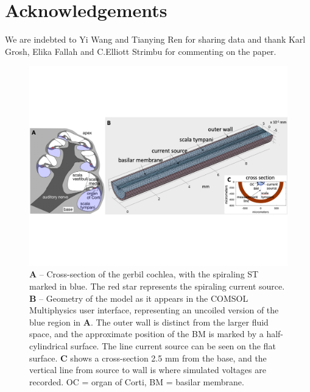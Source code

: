 \documentclass{biophys-new}
\begin{document}
\section{Acknowledgements}
\par{We are indebted to Yi Wang and Tianying Ren for sharing data and thank Karl Grosh, Elika Fallah and C.Elliott Strimbu for commenting on the paper.}

\clearpage
\begin{figure}[h]
\centering
\includegraphics[width=\textwidth]{final_figures/modelfig.pdf}
\caption{\textbf{A} -- Cross-section of the gerbil cochlea, with the spiraling ST marked in blue. The red star represents the spiraling current source.  \textbf{B} -- Geometry of the model as it appears in the COMSOL Multiphysics user interface, representing an uncoiled version of the blue region in \textbf{A}. The outer wall is distinct from the larger fluid space, and the approximate position of the BM is marked by a half-cylindrical surface. The line current source can be seen on the flat surface.  \textbf{C} shows a cross-section 2.5 mm from the base, and the vertical line from source to wall is where simulated voltages are recorded. OC = organ of Corti, BM = basilar membrane.}
\label{geometry}
\end{figure}
\end{document}
